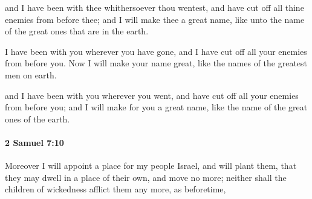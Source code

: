 			\begin{versebox}
					\item[BHS] 
					\item[ASV] and I have been with thee whithersoever thou wentest, and have cut off all thine enemies from before thee; and I will make thee a great name, like unto the name of the great ones that are in the earth.
					\item[NIV] I have been with you wherever you have gone, and I have cut off all your enemies from before you. Now I will make your name great, like the names of the greatest men on earth.
					\item[NRSV] and I have been with you wherever you went, and have cut off all your enemies from before you; and I will make for you a great name, like the name of the great ones of the earth.
			\end{versebox}

		\paragraph{2 Samuel 7:10} %
			\label{2SAMUEL-7-10}

			Moreover I will appoint a place for my people Israel, and will plant them, that they may dwell in a place of their own, and move no more; neither shall the children of wickedness afflict them any more, as beforetime,

